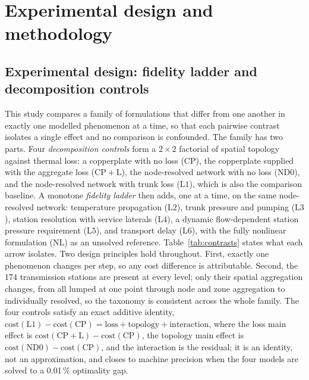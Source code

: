 \documentclass[a4paper,fleqn]{cas-sc}
\newcommand{\CP}{\ensuremath{\mathrm{CP}}}      %
\newcommand{\CPL}{\ensuremath{\mathrm{CP{+}L}}} %
\newcommand{\NDz}{\ensuremath{\mathrm{ND0}}}    %
\newcommand{\Lone}{\ensuremath{\mathrm{L1}}}    %
\newcommand{\Ltwo}{\ensuremath{\mathrm{L2}}}    %
\newcommand{\Lthree}{\ensuremath{\mathrm{L3}}}  %
\newcommand{\Lfour}{\ensuremath{\mathrm{L4}}}   %
\newcommand{\Lfive}{\ensuremath{\mathrm{L5}}}   %
\newcommand{\Lsix}{\ensuremath{\mathrm{L6}}}    %
\newcommand{\NLref}{\ensuremath{\mathrm{NL}}}   %
\begin{document}
\section{Experimental design and methodology}
\label{sec:methodology}

\subsection{Experimental design: fidelity ladder and decomposition controls}
This study compares a family of formulations that differ from one another in exactly one
modelled phenomenon at a time, so that each pairwise contrast isolates a single effect and no
comparison is confounded. The family has two parts. Four \emph{decomposition controls} form a
$2\times2$ factorial of spatial topology against thermal loss: a copperplate with no loss
($\CP$), the copperplate supplied with the aggregate loss ($\CPL$), the node-resolved network
with no loss ($\NDz$), and the node-resolved network with trunk loss ($\Lone$), which is also
the comparison baseline. A monotone \emph{fidelity ladder} then adds, one at a time, on the
same node-resolved network: temperature propagation ($\Ltwo$), trunk pressure and pumping
($\Lthree$), station resolution with service laterals ($\Lfour$), a dynamic flow-dependent
station pressure requirement ($\Lfive$), and transport delay ($\Lsix$), with the fully
nonlinear formulation ($\NLref$) as an unsolved reference. Table~\ref{tab:contrasts} states
what each arrow isolates. Two design principles hold throughout. First, exactly one phenomenon
changes per step, so any cost difference is attributable. Second, the 174 transmission stations
are present at every level; only their spatial aggregation changes, from all lumped at one
point through node and zone aggregation to individually resolved, so the taxonomy is consistent
across the whole family. The four controls satisfy an exact additive identity,
$\text{cost}(\Lone)-\text{cost}(\CP)=\text{loss}+\text{topology}+\text{interaction}$, where the
loss main effect is $\text{cost}(\CPL)-\text{cost}(\CP)$, the topology main effect is
$\text{cost}(\NDz)-\text{cost}(\CP)$, and the interaction is the residual; it is an identity,
not an approximation, and closes to machine precision when the four models are solved to a
0.01\,\% optimality gap.
\end{document}
